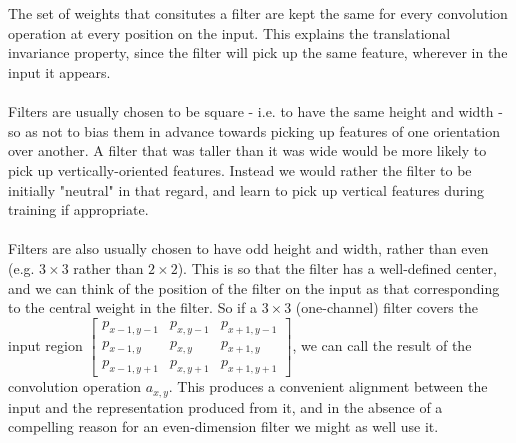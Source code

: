 \documentclass[11pt]{article} %
\theoremstyle{plain}
\theoremstyle{definition}
\begin{document}
\\
\\
\noindent
The set of weights that consitutes a filter are kept the same for every convolution operation at every position on the input. This explains the translational invariance property, since the filter will pick up the same feature, wherever in the input it appears. 
\\
\\
\noindent
Filters are usually chosen to be square - i.e. to have the same height and width - so as not to bias them in advance towards picking up features of one orientation over another. A filter that was taller than it was wide would be more likely to pick up vertically-oriented features. Instead we would rather the filter to be initially "neutral" in that regard, and learn to pick up vertical features during training if appropriate. 
\\
\\
\noindent
Filters are also usually chosen to have odd height and width, rather than even (e.g. \(3 \times 3\) rather than \(2 \times 2\)). This is so that the filter has a well-defined center, and we can think of the position of the filter on the input as that corresponding to the central weight in the filter. So if a \(3 \times 3\) (one-channel) filter covers the input region $\begin{bmatrix}p_{x-1,y-1} & p_{x,y-1} & p_{x+1,y-1} \\ p_{x-1,y} & p_{x,y} & p_{x+1,y} \\ p_{x-1,y+1} & p_{x,y+1} & p_{x+1,y+1} \end{bmatrix}$, we can call the result of the convolution operation \(a_{x,y}\). This produces a convenient alignment between the input and the representation produced from it, and in the absence of a compelling reason for an even-dimension filter we might as well use it.     
\end{document}
